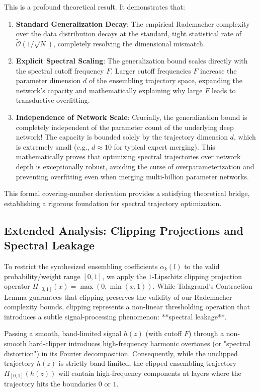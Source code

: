 This is a profound theoretical result. It demonstrates that:
\begin{enumerate}
    \item \textbf{Standard Generalization Decay}: The empirical Rademacher complexity over the data distribution decays at the standard, tight statistical rate of $\widetilde{\mathcal{O}}(1/\sqrt{N})$, completely resolving the dimensional mismatch.
    \item \textbf{Explicit Spectral Scaling}: The generalization bound scales directly with the spectral cutoff frequency $F$. Larger cutoff frequencies $F$ increase the parameter dimension $d$ of the ensembling trajectory space, expanding the network's capacity and mathematically explaining why large $F$ leads to transductive overfitting.
    \item \textbf{Independence of Network Scale}: Crucially, the generalization bound is completely independent of the parameter count of the underlying deep network! The capacity is bounded solely by the trajectory dimension $d$, which is extremely small (e.g., $d \approx 10$ for typical expert merging). This mathematically proves that optimizing spectral trajectories over network depth is exceptionally robust, avoiding the curse of overparameterization and preventing overfitting even when merging multi-billion parameter networks.
\end{enumerate}
This formal covering-number derivation provides a satisfying theoretical bridge, establishing a rigorous foundation for spectral trajectory optimization.


\subsection{Extended Analysis: Clipping Projections and Spectral Leakage}
\label{sec:appendix_clipping_leakage}
To restrict the synthesized ensembling coefficients $\alpha_k(l)$ to the valid probability/weight range $[0, 1]$, we apply the $1$-Lipschitz clipping projection operator $\Pi_{[0,1]}(x) = \max(0, \min(x, 1))$. While Talagrand's Contraction Lemma guarantees that clipping preserves the validity of our Rademacher complexity bounds, clipping represents a non-linear thresholding operation that introduces a subtle signal-processing phenomenon: **spectral leakage**.

Passing a smooth, band-limited signal $h(z)$ (with cutoff $F$) through a non-smooth hard-clipper introduces high-frequency harmonic overtones (or "spectral distortion") in its Fourier decomposition. Consequently, while the unclipped trajectory $h(z)$ is strictly band-limited, the clipped ensembling trajectory $\Pi_{[0,1]}(h(z))$ will contain high-frequency components at layers where the trajectory hits the boundaries $0$ or $1$. 


